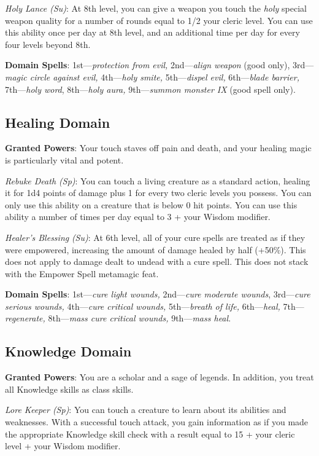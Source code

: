 \textit{Holy Lance (Su)}: At 8th level, you can give a weapon you touch the\textit{ holy }special weapon quality for a number of rounds equal to 1/2 your cleric level. You can use this ability once per day at 8th level, and an additional time per day for every four levels beyond 8th.
				
\textbf{Domain Spells}: 1st---\textit{protection from evil, }2nd---\textit{align weapon }(good only), 3rd---\textit{magic circle against evil, }4th---\textit{holy smite, }5th---\textit{dispel evil, }6th---\textit{blade barrier, }7th---\textit{holy word}, 8th---\textit{holy aura, }9th---\textit{summon monster IX} (good spell only).
				
\subsection{Healing Domain}

				
\textbf{Granted Powers}: Your touch staves off pain and death, and your healing magic is particularly vital and potent.
				
\textit{Rebuke Death (Sp)}: You can touch a living creature as a standard action, healing it for 1d4 points of damage plus 1 for every two cleric levels you possess. You can only use this ability on a creature that is below 0 hit points. You can use this ability a number of times per day equal to 3 + your Wisdom modifier.
				
\textit{Healer's Blessing} \textit{(Su)}: At 6th level, all of your cure spells are treated as if they were empowered, increasing the amount of damage healed by half (+50\%). This does not apply to damage dealt to undead with a cure spell. This does not stack with the Empower Spell metamagic feat.
				
\textbf{Domain Spells}: 1st---\textit{cure light wounds, }2nd---\textit{cure moderate wounds}, 3rd---\textit{cure serious wounds, }4th---\textit{cure critical wounds, }5th---\textit{breath of life, }6th---\textit{heal, }7th---\textit{regenerate, }8th---\textit{mass cure critical wounds, }9th---\textit{mass heal}.
				
\subsection{Knowledge Domain}

				
\textbf{Granted Powers}: You are a scholar and a sage of legends. In addition, you treat all Knowledge skills as class skills.
				
\textit{Lore Keeper (Sp)}: You can touch a creature to learn about its abilities and weaknesses. With a successful touch attack, you gain information as if you made the appropriate Knowledge skill check with a result equal to 15 + your cleric level + your Wisdom modifier.
				
